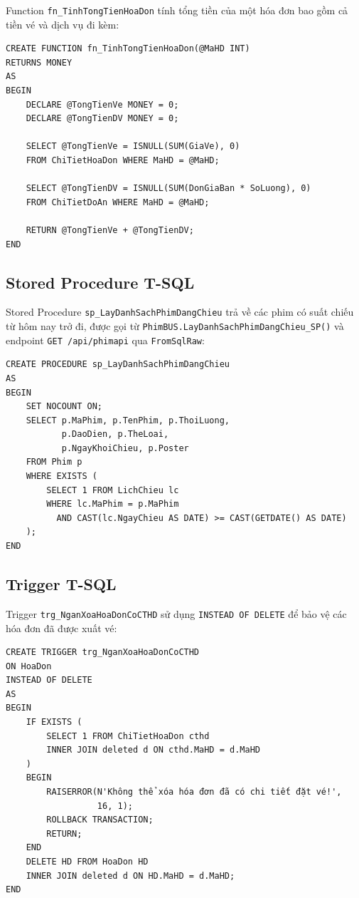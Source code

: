 \documentclass[12pt,a4paper,oneside]{book}
\theoremstyle{plain}
\numberwithin{equation}{chapter}
\begin{document}
\noindent Function \texttt{fn\_TinhTongTienHoaDon} tính tổng tiền của một hóa đơn bao gồm cả tiền vé và dịch vụ đi kèm:

\begin{lstlisting}[style=sqlstyle, caption={Scalar Function tính tổng tiền hóa đơn}]
CREATE FUNCTION fn_TinhTongTienHoaDon(@MaHD INT)
RETURNS MONEY
AS
BEGIN
    DECLARE @TongTienVe MONEY = 0;
    DECLARE @TongTienDV MONEY = 0;
    
    SELECT @TongTienVe = ISNULL(SUM(GiaVe), 0)
    FROM ChiTietHoaDon WHERE MaHD = @MaHD;
    
    SELECT @TongTienDV = ISNULL(SUM(DonGiaBan * SoLuong), 0)
    FROM ChiTietDoAn WHERE MaHD = @MaHD;
    
    RETURN @TongTienVe + @TongTienDV;
END
\end{lstlisting}

\subsection{Stored Procedure T-SQL}

\noindent Stored Procedure \texttt{sp\_LayDanhSachPhimDangChieu} trả về các phim có suất chiếu từ hôm nay trở đi, được gọi từ \texttt{PhimBUS.LayDanhSachPhimDangChieu\_SP()} và endpoint \texttt{GET /api/phimapi} qua \texttt{FromSqlRaw}:

\begin{lstlisting}[style=sqlstyle, caption={Stored Procedure lấy phim đang chiếu}]
CREATE PROCEDURE sp_LayDanhSachPhimDangChieu
AS
BEGIN
    SET NOCOUNT ON;
    SELECT p.MaPhim, p.TenPhim, p.ThoiLuong, 
           p.DaoDien, p.TheLoai, 
           p.NgayKhoiChieu, p.Poster
    FROM Phim p
    WHERE EXISTS (
        SELECT 1 FROM LichChieu lc 
        WHERE lc.MaPhim = p.MaPhim 
          AND CAST(lc.NgayChieu AS DATE) >= CAST(GETDATE() AS DATE)
    );
END
\end{lstlisting}

\subsection{Trigger T-SQL}

\noindent Trigger \texttt{trg\_NganXoaHoaDonCoCTHD} sử dụng \texttt{INSTEAD OF DELETE} để bảo vệ các hóa đơn đã được xuất vé:

\begin{lstlisting}[style=sqlstyle, caption={Trigger ngăn xóa hóa đơn đã có vé}]
CREATE TRIGGER trg_NganXoaHoaDonCoCTHD
ON HoaDon
INSTEAD OF DELETE
AS
BEGIN
    IF EXISTS (
        SELECT 1 FROM ChiTietHoaDon cthd
        INNER JOIN deleted d ON cthd.MaHD = d.MaHD
    )
    BEGIN
        RAISERROR(N'Không thể xóa hóa đơn đã có chi tiết đặt vé!',
                  16, 1);
        ROLLBACK TRANSACTION;
        RETURN;
    END
    DELETE HD FROM HoaDon HD
    INNER JOIN deleted d ON HD.MaHD = d.MaHD;
END
\end{lstlisting}
\end{document}
